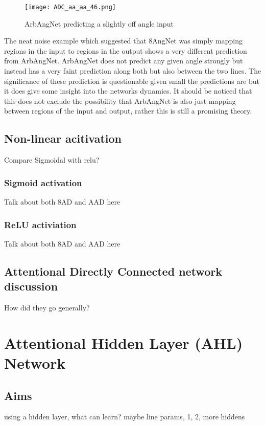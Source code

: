 \begin{figure}[h]
    \centering
    \texttt{[image: ADC\_aa\_aa\_46.png]}
    \caption{ArbAngNet predicting a slightly off angle input}
    \label{fig:ADC_aaaa_fork}
\end{figure}


The neat noise example which suggested that 8AngNet was simply mapping regions in the input to regions in the output shows a very different prediction from ArbAngNet.
ArbAngNet does not predict any given angle strongly but instead has a very faint prediction along both but also between the two lines. 
The significance of these prediction is questionable given small the predictions are but it does give some insight into the networks dynamics.
It should be noticed that this does not exclude the possibility that ArbAngNet is also just mapping between regions of the input and output, rather this is still a promising theory.

\subsection{Non-linear acitivation}
Compare Sigmoidal with relu?

\subsubsection{Sigmoid activation}
Talk about both 8AD and AAD here

\subsubsection{ReLU activiation}
Talk about both 8AD and AAD here 

\subsection{Attentional Directly Connected network discussion}
How did they go generally?

\section{Attentional Hidden Layer (AHL) Network}

\subsection{Aims}
 using a hidden layer, what can learn? maybe line params, 1, 2, more hiddens

